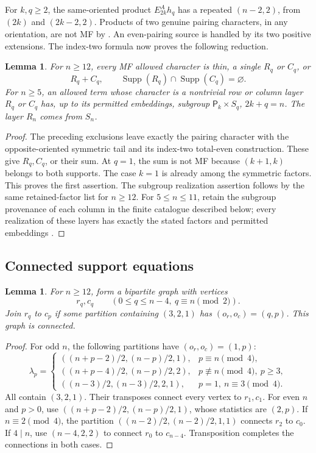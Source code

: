 \documentclass[11pt]{article}
\numberwithin{equation}{section}
\newtheorem{lemma}[theorem]{Lemma}
\theoremstyle{definition}
\DeclareMathOperator{\Supp}{Supp}
\newcommand{\emptypar}{\varnothing}
\newcommand{\pair}{\mathsf P}
\begin{document}
For \(k,q\geq2\), the same-oriented product \(E^A_{2k}h_q\) has a repeated \((n-2,2)\), from \((2k)\) and \((2k-2,2)\).
Products of two genuine pairing characters, in any orientation, are not MF by \cite[Lemma 3.1(c)]{MZperfect}.
An even-pairing source is handled by its two positive extensions.
The index-two formula now proves the following reduction.

\begin{lemma}\label{lem:Acolumns}
For \(n\geq12\), every MF allowed character is thin, a single \(R_q\) or \(C_q\), or
\[
 R_q+C_q,\qquad \Supp(R_q)\cap\Supp(C_q)=\emptypar .
\]
For \(n\geq5\), an allowed term whose character is a nontrivial row or column layer \(R_q\) or \(C_q\) has, up to its permitted embeddings, subgroup
\(\pair_k\times S_q\), \(2k+q=n\).
The layer \(R_n\) comes from \(S_n\).
\end{lemma}
\begin{proof}
The preceding exclusions leave exactly the pairing character with the opposite-oriented symmetric tail and its index-two total-even construction.
These give \(R_q,C_q\), or their sum.
At \(q=1\), the sum is not MF because \((k+1,k)\) belongs to both supports.
The case \(k=1\) is already among the symmetric factors.
This proves the first assertion.
The subgroup realization assertion follows by the same retained-factor list for \(n\geq12\).
For \(5\leq n\leq11\), retain the subgroup provenance of each column in the finite catalogue described below; every realization of these layers has exactly the stated factors and permitted embeddings \cite{ZhangData}.
\end{proof}

\subsection{Connected support equations}

\begin{lemma}\label{lem:Aconnected}
For \(n\geq12\), form a bipartite graph with vertices
\[
 r_q,c_q\qquad(0\leq q\leq n-4,\ q\equiv n\pmod2).
\]
Join \(r_q\) to \(c_p\) if some partition containing \((3,2,1)\) has \((o_r,o_c)=(q,p)\).
This graph is connected.
\end{lemma}
\begin{proof}
For odd \(n\), the following partitions have \((o_r,o_c)=(1,p)\):
\[
 \lambda_p=
 \begin{cases}
 ((n+p-2)/2,(n-p)/2,1),&p\equiv n\pmod4,\\
 ((n+p-4)/2,(n-p)/2,2),&p\not\equiv n\pmod4,\ p\geq3,\\
 ((n-3)/2,(n-3)/2,2,1),&p=1,\ n\equiv3\pmod4.
 \end{cases}
\]
All contain \((3,2,1)\).
Their transposes connect every vertex to \(r_1,c_1\).
For even \(n\) and \(p>0\), use
\(((n+p-2)/2,(n-p)/2,1)\), whose statistics are \((2,p)\).
If \(n\equiv2\pmod4\), the partition
\(((n-2)/2,(n-2)/2,1,1)\) connects \(r_2\) to \(c_0\).
If \(4\mid n\), use \((n-4,2,2)\) to connect \(r_0\) to \(c_{n-4}\).
Transposition completes the connections in both cases.
\end{proof}
\end{document}
